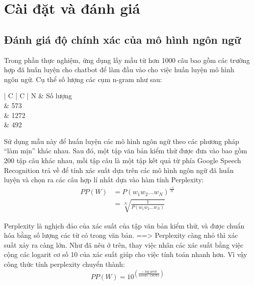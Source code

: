 \documentclass[12pt]{report}
\begin{document}
\chapter{Cài đặt và đánh giá} \label{chap:setup}

\section{Đánh giá độ chính xác của mô hình ngôn ngữ}

Trong phần thực nghiệm, ứng dụng lấy mẫu từ hơn 1000 câu bao gồm các trường hợp đã huấn luyện cho chatbot để làm đầu vào cho việc huấn luyện mô hình ngôn ngữ. Cụ thể số lượng các cụm n-gram như sau:
\begin{table}[h]
	\caption{Số lượng các cụm n-gram trong tập huấn luyện}
	\centering
	\begin{tabular}{ | C | C | }
	\hline
	N & Số lượng \\
	 & 573 \\
	 & 1272 \\
	 & 492 \\
	\hline
	\end{tabular}
\end{table}

Sử dụng mẫu này để huấn luyện các mô hình ngôn ngữ theo các phương pháp ``làm mịn'' khác nhau. Sau đó, một tập văn bản kiểm thử được đưa vào bao gồm 200 tập câu khác nhau, mỗi tập câu là một tập kết quả từ phía Google Speech Recognition trả về để tính xác suất dựa trên các mô hình ngôn ngữ đã huấn luyện và chọn ra các câu hợp lí nhất dựa vào hàm tính Perplexity:
\begin{align*}
PP(W) &= P(w_1w_2 \ldots w_N)^{\frac{-1}{N}} \\
	&= \sqrt[N]{\frac{1}{P(w_1w_2 \ldots w_N)}}
\end{align*}

Perplexity là nghịch đảo của xác suất của tập văn bản kiểm thử, và được chuẩn hóa bằng số lượng các từ có trong văn bản.
==> Perplexity càng nhỏ thì xác suất xảy ra càng lớn. Như đã nêu ở trên, thay việc nhân các xác suất bằng việc cộng các logarit cơ số 10 của xác suất giúp cho việc tính toán nhanh hơn. Vì vậy công thức tính perplexity chuyển thành:
\[PP(W) = 10^{(\frac{-\log\textit{prob}}{\textit{words} - \textit{OOVs}})}\]
\end{document}
